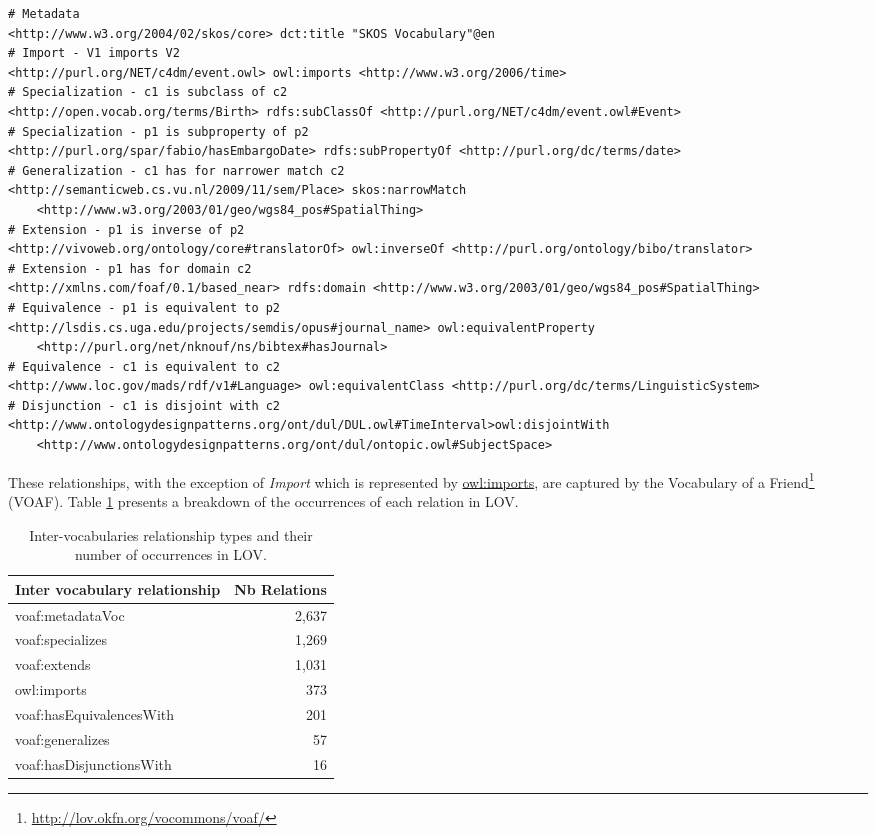 \documentclass{iosart2c}
\begin{document}
\begin{lstlisting}[float=*,basicstyle=\tiny,label={list:voaf}, language=turtle, caption={Examples of Inter-vocabulary relationships.}]
# Metadata
<http://www.w3.org/2004/02/skos/core> dct:title "SKOS Vocabulary"@en
# Import - V1 imports V2
<http://purl.org/NET/c4dm/event.owl> owl:imports <http://www.w3.org/2006/time>
# Specialization - c1 is subclass of c2
<http://open.vocab.org/terms/Birth> rdfs:subClassOf <http://purl.org/NET/c4dm/event.owl#Event>
# Specialization - p1 is subproperty of p2  
<http://purl.org/spar/fabio/hasEmbargoDate> rdfs:subPropertyOf <http://purl.org/dc/terms/date>
# Generalization - c1 has for narrower match c2 
<http://semanticweb.cs.vu.nl/2009/11/sem/Place> skos:narrowMatch 
    <http://www.w3.org/2003/01/geo/wgs84_pos#SpatialThing>
# Extension - p1 is inverse of p2
<http://vivoweb.org/ontology/core#translatorOf> owl:inverseOf <http://purl.org/ontology/bibo/translator>
# Extension - p1 has for domain c2
<http://xmlns.com/foaf/0.1/based_near> rdfs:domain <http://www.w3.org/2003/01/geo/wgs84_pos#SpatialThing>
# Equivalence - p1 is equivalent to p2
<http://lsdis.cs.uga.edu/projects/semdis/opus#journal_name> owl:equivalentProperty 
    <http://purl.org/net/nknouf/ns/bibtex#hasJournal>
# Equivalence - c1 is equivalent to c2 
<http://www.loc.gov/mads/rdf/v1#Language> owl:equivalentClass <http://purl.org/dc/terms/LinguisticSystem>
# Disjunction - c1 is disjoint with c2
<http://www.ontologydesignpatterns.org/ont/dul/DUL.owl#TimeInterval>owl:disjointWith 
    <http://www.ontologydesignpatterns.org/ont/dul/ontopic.owl#SubjectSpace>
\end{lstlisting}

These relationships, with the exception of \emph{Import} which is represented by \url{owl:imports}, are captured by the Vocabulary of a Friend\footnote{\url{http://lov.okfn.org/vocommons/voaf/}} (VOAF). Table \ref{tab:voaf} presents a breakdown of the occurrences of each relation in LOV.

\begin{table}[h!tb]
\caption{Inter-vocabularies relationship types and their number of occurrences in LOV.}
\begin{tabular}{lr}
\hline
\textbf{Inter vocabulary relationship} & \textbf{Nb Relations} \\ \hline
voaf:metadataVoc & 2,637 \\
voaf:specializes & 1,269 \\
voaf:extends & 1,031 \\
owl:imports & 373 \\
voaf:hasEquivalencesWith & 201 \\
voaf:generalizes & 57 \\
voaf:hasDisjunctionsWith & 16 \\
\hline  
\end{tabular}
\label{tab:voaf}
\end{table}
\end{document}
